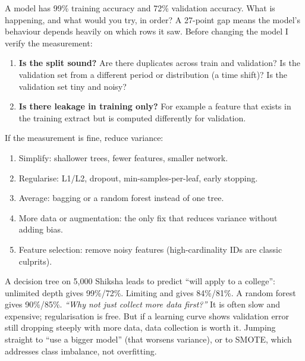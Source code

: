 \begin{qa}{ A model has 99\% training accuracy and 72\% validation accuracy.
What is happening, and what would you try, in order?}
\why
A 27-point gap means the model's behaviour depends heavily on which rows it saw. Before changing the model I
verify the measurement:
\begin{enumerate}
\item \textbf{Is the split sound?} Are there duplicates across train and validation? Is the validation set
  from a different period or distribution (a time shift)? Is the validation set tiny and noisy?
\item \textbf{Is there leakage in training only?} For example a feature that exists in the training extract
  but is computed differently for validation.
\end{enumerate}
If the measurement is fine, reduce variance:
\begin{enumerate}
\item Simplify: shallower trees, fewer features, smaller network.
\item Regularise: L1/L2, dropout, min-samples-per-leaf, early stopping.
\item Average: bagging or a random forest instead of one tree.
\item More data or augmentation: the only fix that reduces variance without adding bias.
\item Feature selection: remove noisy features (high-cardinality IDs are classic culprits).
\end{enumerate}
\worked A decision tree on 5{,}000 Shiksha leads to predict ``will apply to a college'': unlimited depth gives
99\%/72\%. Limiting  and  gives 84\%/81\%. A random forest
gives 90\%/85\%.
\pushes \emph{``Why not just collect more data first?''} It is often slow and expensive; regularisation is
free. But if a learning curve shows validation error still dropping steeply with more data, data collection
is worth it.
\pitfall Jumping straight to ``use a bigger model'' (that worsens variance), or to SMOTE, which addresses class
imbalance, not overfitting.
\end{qa}

